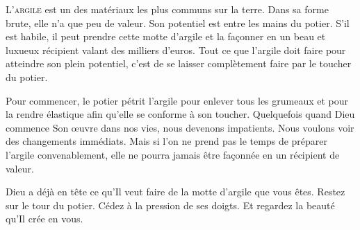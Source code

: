 
\dvrule






\lettrine{L}{'argile} est un des matériaux les plus communs sur la terre.
 Dans sa forme brute, elle n'a que peu de valeur.
 Son potentiel est entre les mains du potier.
 S'il est habile, il peut prendre cette motte d'argile et la fa\c{c}onner
 en un beau et luxueux récipient valant des milliers d'euros.
 Tout ce que l'argile doit faire pour atteindre son plein potentiel,
 c'est de se laisser complètement faire par le toucher du potier. 


Pour commencer, le potier pétrit l'argile pour enlever tous les grumeaux
 et pour la rendre élastique afin qu'elle se conforme à son toucher.
 Quelquefois quand Dieu commence Son \oe{}uvre dans nos vies,
 nous devenons impatients. Nous voulons voir des changements immédiats.
 Mais si l'on ne prend pas le temps de préparer l'argile convenablement,
 elle ne pourra jamais être fa\c{c}onnée en un récipient de valeur. 

Dieu a déjà en tête ce qu'Il veut faire de la motte d'argile que vous êtes.
 Restez sur le tour du potier. Cédez à la pression de ses doigts.
 Et regardez la beauté qu'Il crée en vous. 

